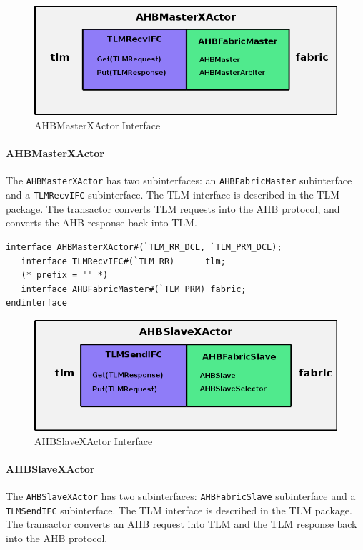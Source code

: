 \documentclass[twoside,letterpaper]{article}
\newcommand{\te}[1]{\texttt{#1}}
\begin{document}

\begin{figure}[ht]
\begin{center}
\includegraphics[height = 1 in]{AHBMasterXActor}
\caption{AHBMasterXActor Interface}
\label{AHBmasterXActor}
\end{center}
\end{figure}

\paragraph{\bf AHBMasterXActor} The \te{AHBMasterXActor} has two subinterfaces: 
an \te{AHBFabricMaster} subinterface and a \te{TLMRecvIFC}
subinterface.  The TLM interface is described in the TLM package.  The transactor converts TLM requests into the AHB
protocol, and converts the AHB response back into TLM.


\begin{verbatim}
interface AHBMasterXActor#(`TLM_RR_DCL, `TLM_PRM_DCL);
   interface TLMRecvIFC#(`TLM_RR)      tlm;
   (* prefix = "" *)
   interface AHBFabricMaster#(`TLM_PRM) fabric;
endinterface
\end{verbatim}


\begin{figure}[ht]
\begin{center}
\includegraphics[height = 1 in]{AHBSlaveXActor}
\caption{AHBSlaveXActor Interface}
\label{AHBSlaveXActor}
\end{center}
\end{figure}

\paragraph{\bf AHBSlaveXActor} The \te{AHBSlaveXActor} has two subinterfaces:
\te{AHBFabricSlave} subinterface and a \te{TLMSendIFC}
subinterface. The TLM interface is described in the TLM package.
 The transactor converts an AHB request into TLM
and the TLM response back into the AHB protocol.
\end{document}
